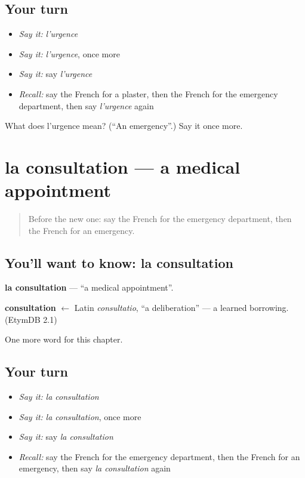 \subsection*{Your turn}
\begin{itemize}
\raggedright
  \item \emph{Say it:} \emph{l'urgence}
  \item \emph{Say it:} \emph{l'urgence}, once more
  \item \emph{Say it:} say \emph{l'urgence}
  \item \emph{Recall:} say the French for a plaster, then the French for the emergency department, then say \emph{l'urgence} again
\end{itemize}

\begin{tcolorbox}[breakable,colback=teal!4,colframe=teal!35!black,title={Before you move on}]
What does l'urgence mean? (\textquotedblleft{}An emergency\textquotedblright{}.) Say it once more.
\end{tcolorbox}
\section[la consultation]{la consultation — a medical appointment}

\label{lesson:FR-C243-consultation}



\begin{quote}
Before the new one: say the French for the emergency department, then the French for an emergency.
\end{quote}

\subsection*{You'll want to know: la consultation}
\textbf{la consultation} — \textquotedblleft{}a medical appointment\textquotedblright{}.

\begin{cousinweb}
\textbf{consultation} $\leftarrow$ Latin \emph{consultatio}, \textquotedblleft{}a deliberation\textquotedblright{} — a learned borrowing. (EtymDB 2.1)
\end{cousinweb}

\begin{grammarlens}[title={What you've built}]
One more word for this chapter.
\end{grammarlens}

\subsection*{Your turn}
\begin{itemize}
\raggedright
  \item \emph{Say it:} \emph{la consultation}
  \item \emph{Say it:} \emph{la consultation}, once more
  \item \emph{Say it:} say \emph{la consultation}
  \item \emph{Recall:} say the French for the emergency department, then the French for an emergency, then say \emph{la consultation} again
\end{itemize}

